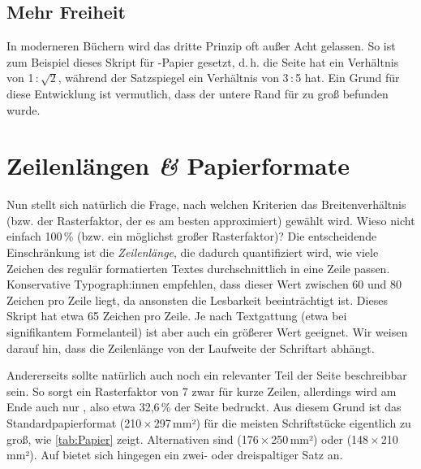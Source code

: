 \subsection{Mehr Freiheit}
\label{subsec:Freiheit}

In moderneren Büchern wird das dritte Prinzip oft außer Acht gelassen. So ist
zum Beispiel dieses Skript für -Papier gesetzt, d.\,h. die Seite hat
ein Verhältnis von 1\,:\,$\sqrt{\text{2}}$, während der Satzspiegel ein
Verhältnis von 3\,:\,5 hat. Ein Grund für diese Entwicklung ist vermutlich, dass
der untere Rand für zu groß befunden wurde.

\section{Zeilenlängen \emph{\&} Papierformate}

Nun stellt sich natürlich die Frage, nach welchen Kriterien das
Breitenverhältnis (bzw. der Rasterfaktor, der es am besten approximiert) gewählt
wird. Wieso nicht einfach 100\,\% (bzw. ein möglichst großer Rasterfaktor)? Die
entscheidende Einschränkung ist die \emph{Zeilenlänge}, die dadurch
quantifiziert wird, wie viele Zeichen des regulär formatierten Textes
durchschnittlich in eine Zeile passen. Konservative Typograph:innen empfehlen,
dass dieser Wert zwischen 60 und 80 Zeichen pro Zeile liegt, da ansonsten die
Lesbarkeit beeinträchtigt ist. Dieses Skript hat etwa 65 Zeichen pro Zeile. Je
nach Textgattung (etwa bei signifikantem Formelanteil) ist aber auch ein
größerer Wert geeignet. Wir weisen darauf hin, dass die Zeilenlänge von der
Laufweite der Schriftart abhängt.

Andererseits sollte natürlich auch noch ein relevanter Teil der Seite
beschreibbar sein. So sorgt ein Rasterfaktor von 7 zwar für kurze Zeilen,
allerdings wird am Ende auch nur , also etwa 32,6\,\% der
Seite bedruckt. Aus diesem Grund ist das Standardpapierformat 
(210\,×\,297\,mm²) für die meisten Schriftstücke eigentlich zu groß, wie
\cref{tab:Papier} zeigt. Alternativen sind  (176\,×\,250\,mm²) oder
 (148\,×\,210\,mm²). Auf  bietet sich hingegen ein
zwei- oder dreispaltiger Satz an.

